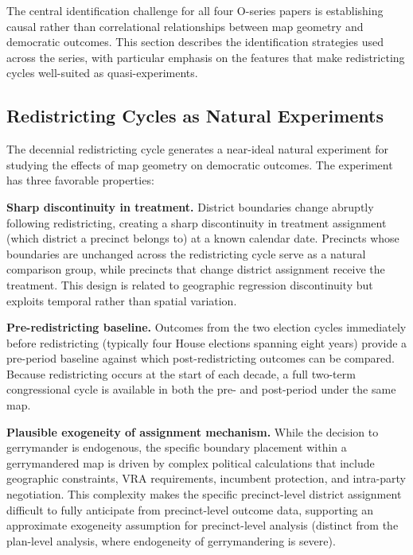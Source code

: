 \label{sec:identification}

The central identification challenge for all four O-series papers is establishing
causal rather than correlational relationships between map geometry and democratic
outcomes. This section describes the identification strategies used across the series,
with particular emphasis on the features that make redistricting cycles well-suited
as quasi-experiments.

\subsection{Redistricting Cycles as Natural Experiments}

The decennial redistricting cycle generates a near-ideal natural experiment for
studying the effects of map geometry on democratic outcomes. The experiment has
three favorable properties:

\textbf{Sharp discontinuity in treatment.} District boundaries change abruptly
following redistricting, creating a sharp discontinuity in treatment assignment
(which district a precinct belongs to) at a known calendar date. Precincts whose
boundaries are unchanged across the redistricting cycle serve as a natural comparison
group, while precincts that change district assignment receive the treatment.
This design is related to geographic regression discontinuity \citep{keeleTimmons2016}
but exploits temporal rather than spatial variation.

\textbf{Pre-redistricting baseline.} Outcomes from the two election cycles immediately
before redistricting (typically four House elections spanning eight years) provide
a pre-period baseline against which post-redistricting outcomes can be compared.
Because redistricting occurs at the start of each decade, a full two-term congressional
cycle is available in both the pre- and post-period under the same map.

\textbf{Plausible exogeneity of assignment mechanism.} While the decision to gerrymander
is endogenous, the specific boundary placement within a gerrymandered map is driven by
complex political calculations that include geographic constraints, VRA requirements,
incumbent protection, and intra-party negotiation. This complexity makes the specific
precinct-level district assignment difficult to fully anticipate from precinct-level
outcome data, supporting an approximate exogeneity assumption for precinct-level analysis
(distinct from the plan-level analysis, where endogeneity of gerrymandering is severe).


